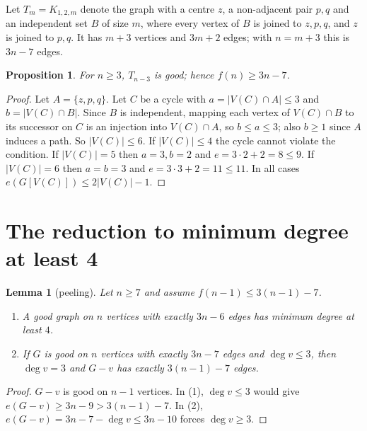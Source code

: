\documentclass[11pt]{amsart}
\newtheorem{lemma}{Lemma}
\newtheorem{proposition}{Proposition}
\theoremstyle{remark}
\newcommand{\Tm}[1]{T_{#1}}
\begin{document}
Let $\Tm m=K_{1,2,m}$ denote the graph with a centre $z$, a non-adjacent pair $p,q$ and an independent set $B$ of size $m$, where every vertex of $B$ is joined to $z,p,q$, and $z$ is joined to $p,q$. It has $m+3$ vertices and $3m+2$ edges; with $n=m+3$ this is $3n-7$ edges.

\begin{proposition}\label{prop:lower}
For $n\ge3$, $\Tm{n-3}$ is good; hence $f(n)\ge 3n-7$.
\end{proposition}
\begin{proof}
Let $A=\{z,p,q\}$. Let $C$ be a cycle with $a=|V(C)\cap A|\le 3$ and $b=|V(C)\cap B|$. Since $B$ is independent, mapping each vertex of $V(C)\cap B$ to its successor on $C$ is an injection into $V(C)\cap A$, so $b\le a\le3$; also $b\ge1$ since $A$ induces a path. So $|V(C)|\le 6$. If $|V(C)|\le4$ the cycle cannot violate the condition. If $|V(C)|=5$ then $a=3,b=2$ and $e=3\cdot2+2=8\le 9$. If $|V(C)|=6$ then $a=b=3$ and $e=3\cdot 3+2=11\le 11$. In all cases $e(G[V(C)])\le 2|V(C)|-1$.
\end{proof}

\section{The reduction to minimum degree at least 4}

\begin{lemma}[peeling]\label{lem:peel}
Let $n\ge7$ and assume $f(n-1)\le 3(n-1)-7$.
\begin{enumerate}
\item A good graph on $n$ vertices with exactly $3n-6$ edges has minimum degree at least $4$.
\item If $G$ is good on $n$ vertices with exactly $3n-7$ edges and $\deg v\le 3$, then $\deg v=3$ and $G-v$ has exactly $3(n-1)-7$ edges.
\end{enumerate}
\end{lemma}
\begin{proof}
$G-v$ is good on $n-1$ vertices. In (1), $\deg v\le3$ would give $e(G-v)\ge 3n-9>3(n-1)-7$. In (2), $e(G-v)=3n-7-\deg v\le 3n-10$ forces $\deg v\ge3$.
\end{proof}
\end{document}
